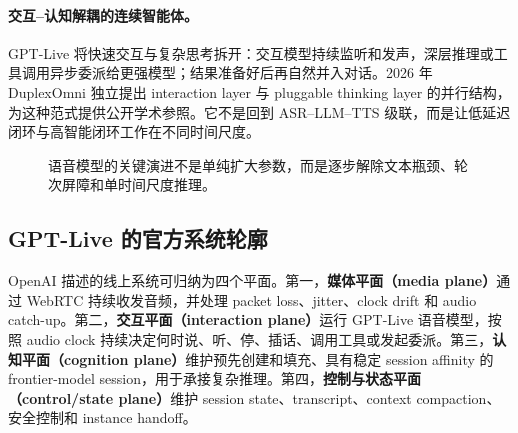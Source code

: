 \paragraph{交互--认知解耦的连续智能体。}
\FOne GPT-Live 将快速交互与复杂思考拆开：交互模型持续监听和发声，深层推理或工具调用异步委派给更强模型；结果准备好后再自然并入对话\cite{openai2026gptlive,openai2026continuous}。2026 年 DuplexOmni 独立提出 interaction layer 与 pluggable thinking layer 的并行结构\cite{huang2026duplexomni}，为这种范式提供公开学术参照。它不是回到 ASR--LLM--TTS 级联，而是让低延迟闭环与高智能闭环工作在不同时间尺度。

\begin{figure}[H]
\centering
{}
\caption{语音模型的关键演进不是单纯扩大参数，而是逐步解除文本瓶颈、轮次屏障和单时间尺度推理。}
\label{fig:evolution}
\end{figure}

\subsection{GPT-Live 的官方系统轮廓}

\FOne OpenAI 描述的线上系统可归纳为四个平面。第一，\textbf{媒体平面（media plane）}通过 WebRTC 持续收发音频，并处理 packet loss、jitter、clock drift 和 audio catch-up。第二，\textbf{交互平面（interaction plane）}运行 GPT-Live 语音模型，按照 audio clock 持续决定何时说、听、停、插话、调用工具或发起委派。第三，\textbf{认知平面（cognition plane）}维护预先创建和填充、具有稳定 session affinity 的 frontier-model session，用于承接复杂推理。第四，\textbf{控制与状态平面（control/state plane）}维护 session state、transcript、context compaction、安全控制和 instance handoff\cite{openai2026continuous,openai2026safety}。

